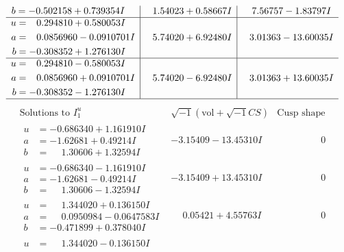 \documentclass[1p]{elsarticle_modified}
\theoremstyle{definition}
\newcommand{\I}{\sqrt{-1}}
\begin{document}
$$\begin{array}{c|c|c}
\begin{aligned}
b &= -0.502158 + 0.739354 I\end{aligned}
 & \phantom{-}1.54023 + 0.58667 I & \phantom{-}7.56757 - 1.83797 I \\ \hline\begin{aligned}
u &= \phantom{-}0.294810 + 0.580053 I \\
a &= \phantom{-}0.0856960 - 0.0910701 I \\
b &= -0.308352 + 1.276130 I\end{aligned}
 & \phantom{-}5.74020 + 6.92480 I & \phantom{-}3.01363 - 13.60035 I \\ \hline\begin{aligned}
u &= \phantom{-}0.294810 - 0.580053 I \\
a &= \phantom{-}0.0856960 + 0.0910701 I \\
b &= -0.308352 - 1.276130 I\end{aligned}
 & \phantom{-}5.74020 - 6.92480 I & \phantom{-}3.01363 + 13.60035 I\\
 \hline 
 \end{array}$$\newpage$$\begin{array}{c|c|c}  
\text{Solutions to }I^u_{1}& \I (\text{vol} + \sqrt{-1}CS) & \text{Cusp shape}\\
 \hline 
\begin{aligned}
u &= -0.686340 + 1.161910 I \\
a &= -1.62681 + 0.49214 I \\
b &= \phantom{-}1.30606 + 1.32594 I\end{aligned}
 & -3.15409 - 13.45310 I & \phantom{-0.000000 } 0 \\ \hline\begin{aligned}
u &= -0.686340 - 1.161910 I \\
a &= -1.62681 - 0.49214 I \\
b &= \phantom{-}1.30606 - 1.32594 I\end{aligned}
 & -3.15409 + 13.45310 I & \phantom{-0.000000 } 0 \\ \hline\begin{aligned}
u &= \phantom{-}1.344020 + 0.136150 I \\
a &= \phantom{-}0.0950984 - 0.0647583 I \\
b &= -0.471899 + 0.378040 I\end{aligned}
 & \phantom{-}0.05421 + 4.55763 I & \phantom{-0.000000 } 0 \\ \hline\begin{aligned}
u &= \phantom{-}1.344020 - 0.136150 I \\

\end{aligned}
\end{array}$$
\end{document}
